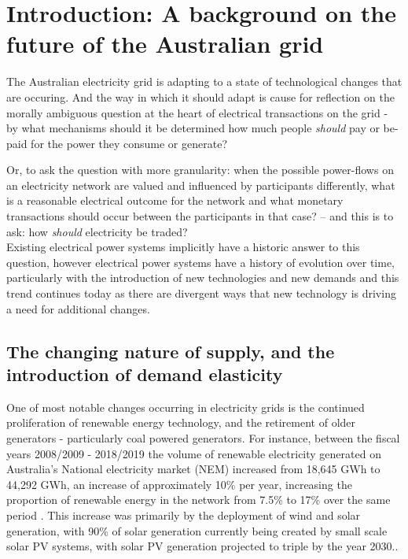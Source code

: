 \chapter{Introduction: A background on the future of the Australian grid}
\label{cha:intro}

The Australian electricity grid is adapting to a state of technological changes that are occuring.
And the way in which it should adapt is cause for reflection on the morally ambiguous question at the heart of electrical transactions on the grid - by what mechanisms should it be determined how much people \textit{should} pay or be-paid for the power they consume or generate?

Or, to ask the question with more granularity: when the possible power-flows on an electricity network are valued and influenced by participants differently, 
what is a reasonable electrical outcome for the network and what monetary transactions should occur between the participants in that case? -- and this is to ask: how \textit{should} electricity be traded?\\

Existing electrical power systems implicitly have a historic answer to this question, however electrical power systems have a history of evolution over time, particularly with the introduction of new technologies and new demands and this trend continues today as there are divergent ways that new technology is driving a need for additional changes.

\section{The changing nature of supply, and the introduction of demand elasticity}

One of most notable changes occurring in electricity grids is the continued proliferation of renewable energy technology, and the retirement of older generators - particularly coal powered generators.
For instance, between the fiscal years 2008/2009 - 2018/2019 the volume of renewable electricity generated on Australia's National electricity market (NEM) increased from 18,645 GWh to 44,292 GWh, an increase of approximately 10\% per year, increasing the proportion of renewable energy in the network from 7.5\% to 17\% over the same period
\cite{departmentoftheenvironmentenergy2018}.
This increase was primarily by the deployment of wind and solar generation, with 90\% of solar generation currently being created by small scale solar PV systems, with solar PV generation projected to triple by the year 2030.\cite{australianenergymarketoperatorlimited2018}.

